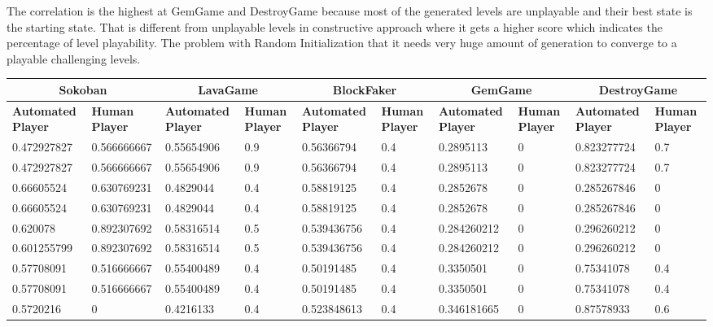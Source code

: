 The correlation is the highest at GemGame and DestroyGame because most of the generated levels are unplayable and their best state is the starting state. That is different from unplayable levels in constructive approach where it gets a higher score which indicates the percentage of level playability. The problem with Random Initialization that it needs very huge amount of generation to converge to a playable challenging levels.

\begin{landscape}
\begin{table}[!ht]
	\centering
	\begin{tabular}{|p{0.8in}|p{0.8in}|p{0.8in}|p{0.8in}|p{0.8in}|p{0.8in}|p{0.8in}|p{0.8in}|p{0.8in}|p{0.8in}|}
		\hline
		\multicolumn{2}{c}{\textbf{Sokoban}} & \multicolumn{2}{c}{\textbf{LavaGame}} & \multicolumn{2}{c}{\textbf{\textbf{BlockFaker}}} & \multicolumn{2}{c}{\textbf{GemGame}} & \multicolumn{2}{c}{\textbf{DestroyGame}}\\
		\hline
		\textbf{Automated Player} & \textbf{Human Player} & \textbf{Automated Player} & \textbf{Human Player} & \textbf{Automated Player} & \textbf{Human Player} & \textbf{Automated Player} & \textbf{Human Player} & \textbf{Automated Player} & \textbf{Human Player}\\
		\hline
		0.472927827 & 0.566666667 & 0.55654906 & 0.9 & 0.56366794 & 0.4 & 0.2895113 & 0 & 0.823277724 & 0.7\\
		\hline
		0.472927827 & 0.566666667 & 0.55654906 & 0.9 & 0.56366794 & 0.4 & 0.2895113 & 0 & 0.823277724 & 0.7\\
		\hline
		0.66605524 & 0.630769231 & 0.4829044 & 0.4 & 0.58819125 & 0.4 & 0.2852678 & 0 & 0.285267846 & 0\\
		\hline
		0.66605524 & 0.630769231 & 0.4829044 & 0.4 & 0.58819125 & 0.4 & 0.2852678 & 0 & 0.285267846 & 0\\
		\hline
		0.620078 & 0.892307692 & 0.58316514 & 0.5 & 0.539436756 & 0.4 & 0.284260212 & 0 & 0.296260212 & 0\\
		\hline
		0.601255799 & 0.892307692 & 0.58316514 & 0.5 & 0.539436756 & 0.4 & 0.284260212 & 0 & 0.296260212 & 0\\
		\hline
		0.57708091 & 0.516666667 & 0.55400489 & 0.4 & 0.50191485 & 0.4 & 0.3350501 & 0 & 0.75341078 & 0.4\\
		\hline
		0.57708091 & 0.516666667 & 0.55400489 & 0.4 & 0.50191485 & 0.4 & 0.3350501 & 0 & 0.75341078 & 0.4\\
		\hline
		0.5720216 & 0 & 0.4216133 & 0.4 & 0.523848613 & 0.4 & 0.346181665 & 0 & 0.87578933 & 0.6\\

\end{tabular}
\end{table}
\end{landscape}
